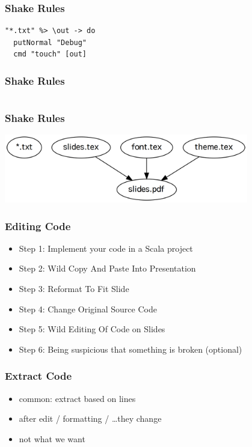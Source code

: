 \documentclass{beamer}
\begin{document}
\begin{frame}[fragile]
  \frametitle{Shake Rules}
  \begin{verbatim}
"*.txt" %> \out -> do
  putNormal "Debug"
  cmd "touch" [out]
  \end{verbatim}
\end{frame}

\begin{frame}[fragile]
  \frametitle{Shake Rules}
  \inputminted[autogobble]{haskell}{snippets/pdf-rule.hs}
\end{frame}

\begin{frame}
  \frametitle{Shake Rules}
  \begin{center}
    \includegraphics[width=0.8\textwidth]{graphviz/rules.png}
  \end{center}
\end{frame}

\begin{frame}
  \frametitle{Editing Code}
  \begin{itemize}
  \item Step 1: Implement your code in a Scala project
  \item Step 2: Wild Copy And Paste Into Presentation
  \item Step 3: Reformat To Fit Slide
  \item Step 4: Change Original Source Code
  \item Step 5: Wild Editing Of Code on Slides
  \item Step 6: Being suspicious that something is broken (optional)
  \end{itemize}
\end{frame}

\begin{frame}[fragile]
  \frametitle{Extract Code}
  \begin{itemize}
  \item common: extract based on lines
  \item after edit / formatting / \ldots they change
  \item not what we want
  \end{itemize}
\end{frame}
\end{document}
